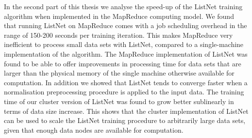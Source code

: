 In the second part of this thesis we analyse the speed-up of the ListNet training algorithm when implemented in the MapReduce computing model. We found that running ListNet on MapReduce comes with a job scheduling overhead in the range of 150-200 seconds per training iteration. This makes MapReduce very inefficient to process small data sets with ListNet, compared to a single-machine implementation of the algorithm. The MapReduce implementation of ListNet was found to be able to offer improvements in processing time for data sets that are larger than the physical memory of the single machine otherwise available for computation. In addition we showed that ListNet tends to converge faster when a normalisation preprocessing procedure is applied to the input data. The training time of our cluster version of ListNet was found to grow better sublinearly in terms of data size increase. This shows that the cluster implementation of ListNet can be used to scale the ListNet training procedure to arbitrarily large data sets, given that enough data nodes are available for computation.



\endgroup			

\vfill